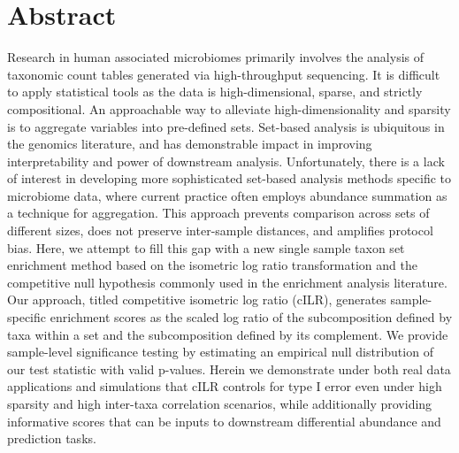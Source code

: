 \documentclass[10pt,letterpaper]{article}
\begin{document}
\section*{Abstract}
Research in human associated microbiomes primarily involves the analysis of taxonomic count tables generated via high-throughput sequencing. It is difficult to apply statistical tools as the data is high-dimensional, sparse, and strictly compositional. An approachable way to alleviate high-dimensionality and sparsity is to aggregate variables into pre-defined sets. Set-based analysis is ubiquitous in the genomics literature, and has demonstrable impact in improving interpretability and power of downstream analysis. Unfortunately, there is a lack of interest in developing more sophisticated set-based analysis methods specific to microbiome data, where current practice often employs abundance summation as a technique for aggregation. This approach prevents comparison across sets of different sizes, does not preserve inter-sample distances, and amplifies protocol bias. Here, we attempt to fill this gap with a new single sample taxon set enrichment method based on the isometric log ratio transformation and the competitive null hypothesis commonly used in the enrichment analysis literature. Our approach, titled competitive isometric log ratio (cILR), generates sample-specific enrichment scores as the scaled log ratio of the subcomposition defined by taxa within a set and the subcomposition defined by its complement. We provide sample-level significance testing by estimating an empirical null distribution of our test statistic with valid p-values. Herein we demonstrate under both real data applications and simulations that cILR controls for type I error even under high sparsity and high inter-taxa correlation scenarios, while additionally providing informative scores that can be inputs to downstream differential abundance and prediction tasks. 


\end{document}
